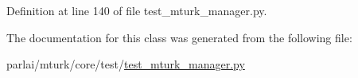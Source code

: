 Definition at line 140 of file test\+\_\+mturk\+\_\+manager.\+py.



The documentation for this class was generated from the following file\+:\begin{DoxyCompactItemize}
\item 
parlai/mturk/core/test/\hyperlink{test_2test__mturk__manager_8py}{test\+\_\+mturk\+\_\+manager.\+py}\end{DoxyCompactItemize}
